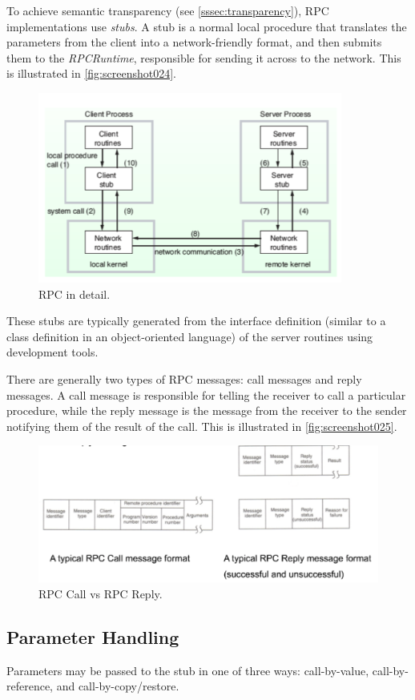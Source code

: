 To achieve semantic transparency (see \autoref{sssec:transparency}), RPC implementations use \textit{stubs}. A stub is a normal local procedure that translates the parameters from the client into a network-friendly format, and then submits them to the \textit{RPCRuntime}, responsible for sending it across to the network. This is illustrated in \autoref{fig:screenshot024}.

\begin{figure}
\centering
\includegraphics[width=0.7\linewidth]{figures/screenshot024}
\caption{RPC in detail.}
\label{fig:screenshot024}
\end{figure}

These stubs are typically generated from the interface definition (similar to a class definition in an object-oriented language) of the server routines using development tools. 

There are generally two types of RPC messages: call messages and reply messages. A call message is responsible for telling the receiver to call a particular procedure, while the reply message is the message from the receiver to the sender notifying them of the result of the call. This is illustrated in \autoref{fig:screenshot025}.

\begin{figure}
\centering
\includegraphics[width=0.7\linewidth]{figures/screenshot025}
\caption{RPC Call vs RPC Reply.}
\label{fig:screenshot025}
\end{figure}

\subsection{Parameter Handling}
Parameters may be passed to the stub in one of three ways: call-by-value, call-by-reference, and call-by-copy/restore.


